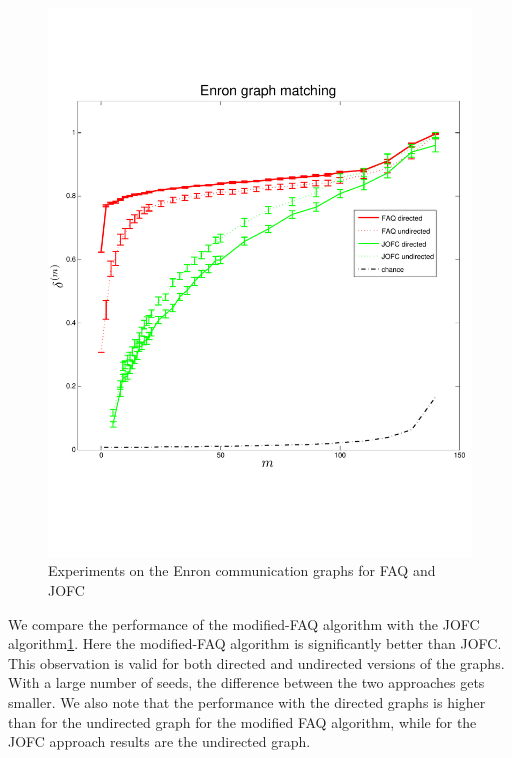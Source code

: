 \documentclass[12pt,oneside,final]{thesis}
\begin{document}
\begin{figure}
\includegraphics[scale=0.75]{enron-JOFC-FAQ-paper.pdf}
\caption{Experiments on the Enron communication graphs for FAQ and JOFC \label{enron_graphmatch_faq_jofc}}
\end{figure}

We compare the performance of the modified-FAQ algorithm with the JOFC algorithm\ref{enron_graphmatch_faq_jofc}. Here the modified-FAQ algorithm is significantly better than JOFC. This observation  is valid for both directed and undirected versions of the graphs.  With a large  number of seeds, the difference between the two approaches gets smaller. We also note that the performance with the directed graphs is higher than for the undirected graph for the modified FAQ algorithm, while for the JOFC approach  results are   the undirected graph.
\end{document}
